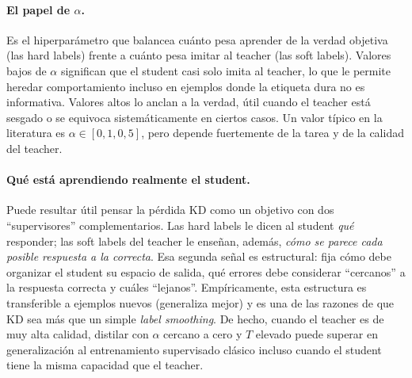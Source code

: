\paragraph{El papel de $\alpha$.} Es el hiperparámetro que balancea cuánto pesa aprender de la verdad objetiva (las hard labels) frente a cuánto pesa imitar al teacher (las soft labels). Valores bajos de $\alpha$ significan que el student casi solo imita al teacher, lo que le permite heredar comportamiento incluso en ejemplos donde la etiqueta dura no es informativa. Valores altos lo anclan a la verdad, útil cuando el teacher está sesgado o se equivoca sistemáticamente en ciertos casos. Un valor típico en la literatura es $\alpha \in [0{,}1, 0{,}5]$, pero depende fuertemente de la tarea y de la calidad del teacher.

\paragraph{Qué está aprendiendo realmente el student.} Puede resultar útil pensar la pérdida KD como un objetivo con dos ``supervisores'' complementarios. Las hard labels le dicen al student \emph{qué} responder; las soft labels del teacher le enseñan, además, \emph{cómo se parece cada posible respuesta a la correcta}. Esa segunda señal es estructural: fija cómo debe organizar el student su espacio de salida, qué errores debe considerar ``cercanos'' a la respuesta correcta y cuáles ``lejanos''. Empíricamente, esta estructura es transferible a ejemplos nuevos (generaliza mejor) y es una de las razones de que KD sea más que un simple \textit{label smoothing}. De hecho, cuando el teacher es de muy alta calidad, distilar con $\alpha$ cercano a cero y $T$ elevado puede superar en generalización al entrenamiento supervisado clásico incluso cuando el student tiene la misma capacidad que el teacher.


